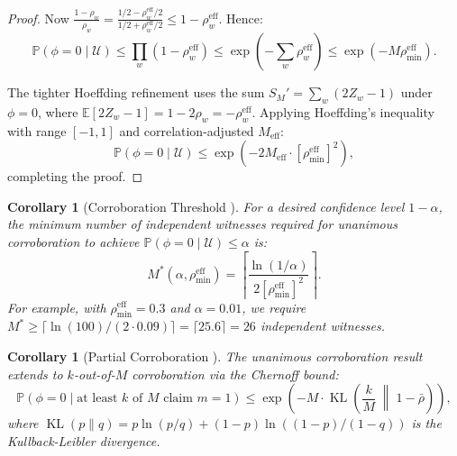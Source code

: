 \documentclass[11pt,a4paper]{article}
\newtheorem{corollary}[theorem]{Corollary}
\theoremstyle{definition}
\DeclareMathOperator{\KL}{KL}
\newcommand{\E}{\mathbb{E}}
\newcommand{\Pbb}{\mathbb{P}}
\newcommand{\fact}{\phi}                        %
\begin{document}
\begin{proof}
Now $\frac{1 - \rho_w}{\rho_w} = \frac{1/2 - \rho_w^{\mathrm{eff}}/2}{1/2 + \rho_w^{\mathrm{eff}}/2} \leq 1 - \rho_w^{\mathrm{eff}}$. Hence:
\begin{equation}
    \Pbb(\fact = 0 \mid \mathcal{U}) \leq \prod_w (1 - \rho_w^{\mathrm{eff}}) \leq \exp\left(-\sum_w \rho_w^{\mathrm{eff}}\right) \leq \exp(-M \rho_{\min}^{\mathrm{eff}}).
\end{equation}

The tighter Hoeffding refinement uses the sum $S_M' = \sum_w (2Z_w - 1)$ under $\fact = 0$, where $\E[2Z_w - 1] = 1 - 2\rho_w = -\rho_w^{\mathrm{eff}}$. Applying Hoeffding's inequality with range $[-1, 1]$ and correlation-adjusted $M_{\mathrm{eff}}$:
\begin{equation}
    \Pbb(\fact = 0 \mid \mathcal{U}) \leq \exp\left(-2 M_{\mathrm{eff}} \cdot [\rho_{\min}^{\mathrm{eff}}]^2\right),
\end{equation}
completing the proof.
\end{proof}

\begin{corollary}[Corroboration Threshold ]
\label{cor:threshold}
For a desired confidence level $1 - \alpha$, the minimum number of independent witnesses required for unanimous corroboration to achieve $\Pbb(\fact = 0 \mid \mathcal{U}) \leq \alpha$ is:
\begin{equation}
    M^*(\alpha, \rho_{\min}^{\mathrm{eff}}) = \left\lceil \frac{\ln(1/\alpha)}{2 [\rho_{\min}^{\mathrm{eff}}]^2} \right\rceil.
    \label{eq:M_star}
\end{equation}
For example, with $\rho_{\min}^{\mathrm{eff}} = 0.3$ and $\alpha = 0.01$, we require $M^* \geq \lceil \ln(100) / (2 \cdot 0.09) \rceil = \lceil 25.6 \rceil = 26$ independent witnesses.
\end{corollary}

\begin{corollary}[Partial Corroboration ]
\label{cor:partial}
The unanimous corroboration result extends to $k$-out-of-$M$ corroboration via the Chernoff bound:
\begin{equation}
    \Pbb(\fact = 0 \mid \text{at least } k \text{ of } M \text{ claim } m=1) \leq \exp\left(-M \cdot \KL\left(\frac{k}{M} \;\middle\|\; 1 - \bar{\rho}\right)\right),
    \label{eq:partial_corroboration}
\end{equation}
where $\KL(p \| q) = p \ln(p/q) + (1-p) \ln((1-p)/(1-q))$ is the Kullback-Leibler divergence.
\end{corollary}
\end{document}

